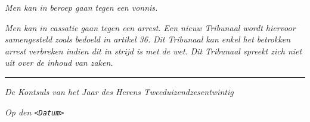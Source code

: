 \emph{Men kan in beroep gaan tegen een vonnis.}

\emph{Men kan in cassatie gaan tegen een arrest.} \emph{Een nieuw
Tribunaal wordt hiervoor samengesteld zoals bedoeld in artikel 36.}
\emph{Dit Tribunaal kan enkel het betrokken arrest verbreken indien dit
in strijd is met de wet.} \emph{Dit Tribunaal spreekt zich niet uit over
de inhoud van zaken.}

\begin{center}\rule{0.5\linewidth}{0.5pt}\end{center}

\emph{De Kontsuls van het Jaar des Herens Tweeduizendzesentwintig}

\emph{Op den \texttt{\textless{}Datum\textgreater{}}}
